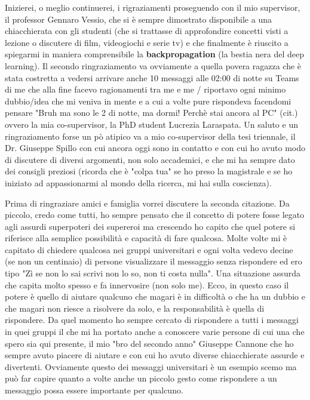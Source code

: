 Inizierei, o meglio continuerei, i rigraziamenti proseguendo con il mio supervisor, il professor Gennaro Vessio, che si è sempre dimostrato disponibile a una chiacchierata con gli studenti (che si trattasse di approfondire concetti visti a lezione o discutere di film, videogiochi e serie tv) e che finalmente è riuscito a spiegarmi in maniera comprensibile la \textbf{backpropagation} (la bestia nera del deep learning). Il secondo ringraziamento va ovviamente a quella povera ragazza che è stata costretta a vedersi arrivare anche 10 messaggi alle 02:00 di notte su Teams di me che alla fine facevo ragionamenti tra me e me / riportavo ogni minimo dubbio/idea che mi veniva in mente e a cui a volte pure rispondeva facendomi pensare "Bruh ma sono le 2 di notte, ma dormi! Perchè stai ancora al PC" (cit.) ovvero la mia co-supervisor, la PhD student Lucrezia Laraspata.
Un saluto e un ringraziamento forse un pò atipico va a mio co-supervisor della tesi triennale, il Dr. Giuseppe Spillo con cui ancora oggi sono in contatto e con cui ho avuto modo di discutere di diversi argomenti, non solo accademici, e che mi ha sempre dato dei consigli preziosi (ricorda che è "colpa tua" se ho preso la magistrale e se ho iniziato ad appassionarmi al mondo della ricerca, mi hai sulla coscienza). 

Prima di ringraziare amici e famiglia vorrei discutere la seconda citazione. Da piccolo, credo come tutti, ho sempre pensato che il concetto di potere fosse legato agli assurdi superpoteri dei supereroi ma crescendo ho capito che quel potere si riferisce alla semplice possibilità e capacità di fare qualcosa. Molte volte mi è capitato di chiedere qualcosa nei gruppi universitari e ogni volta vedevo decine (se non un centinaio) di persone visualizzare il messaggio senza rispondere ed ero tipo "Zì se non lo sai scrivi non lo so, non ti costa nulla". Una situazione assurda che capita molto spesso e fa innervosire (non solo me). Ecco, in questo caso il potere è quello di aiutare qualcuno che magari è in difficoltà o che ha un dubbio e che magari non riesce a risolvere da solo, e la responsabilità è quella di rispondere. Da quel momento ho sempre cercato di rispondere a tutti i messaggi in quei gruppi il che mi ha portato anche a conoscere varie persone di cui una che spero sia qui presente, il mio "bro del secondo anno" Giuseppe Cannone che ho sempre avuto piacere di aiutare e con cui ho avuto diverse chiacchierate assurde e divertenti. Ovviamente questo dei messaggi universitari è un esempio scemo ma può far capire quanto a volte anche un piccolo gesto come rispondere a un messaggio possa essere importante per qualcuno.

